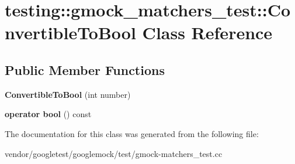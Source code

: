 \hypertarget{classtesting_1_1gmock__matchers__test_1_1_convertible_to_bool}{}\section{testing\+:\+:gmock\+\_\+matchers\+\_\+test\+:\+:Convertible\+To\+Bool Class Reference}
\label{classtesting_1_1gmock__matchers__test_1_1_convertible_to_bool}
\subsection*{Public Member Functions}
\begin{DoxyCompactItemize}
\item 
\mbox{\label{classtesting_1_1gmock__matchers__test_1_1_convertible_to_bool_a4e01a99e144a393bc11a40fb43e8a6f1}} 
{\bfseries Convertible\+To\+Bool} (int number)
\item 
\mbox{\label{classtesting_1_1gmock__matchers__test_1_1_convertible_to_bool_a4ad9766b9d5179a1207af2449405f071}} 
{\bfseries operator bool} () const
\end{DoxyCompactItemize}


The documentation for this class was generated from the following file\+:\begin{DoxyCompactItemize}
\item 
vendor/googletest/googlemock/test/gmock-\/matchers\+\_\+test.\+cc\end{DoxyCompactItemize}
